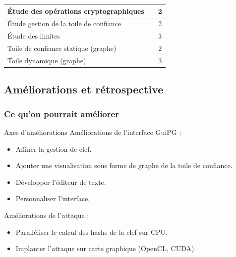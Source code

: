 \begin{frame}
\begin{tabular}{|l|l|l|}
    \hline
    \cellcolor{white}\color{red}\'{E}tude des opérations cryptographiques & \multicolumn{1}{|c|}{\cellcolor{white}\color{black}} & \multicolumn{1}{|c|}{\cellcolor{white}\color{black}2} \\
    \hline
    \cellcolor{white}\color{red}\'{E}tude gestion de la toile de confiance & \multicolumn{1}{|c|}{\cellcolor{white}\color{black}} & \multicolumn{1}{|c|}{\cellcolor{white}\color{black}2} \\
    \hline
    \cellcolor{white}\color{red}\'{E}tude des limites & \multicolumn{1}{|c|}{\cellcolor{white}\color{black}} & \multicolumn{1}{|c|}{\cellcolor{white}\color{black}3} \\
    \hline
    \cellcolor{white}\color{grey}Toile de confiance statique (graphe) & \multicolumn{1}{|c|}{\cellcolor{white}\color{black}} & \multicolumn{1}{|c|}{\cellcolor{white}\color{black}2} \\
    \hline
    \cellcolor{white}\color{grey}Toile dynamique (graphe) & \multicolumn{1}{|c|}{\cellcolor{white}\color{black}} & \multicolumn{1}{|c|}{\cellcolor{white}\color{black}3} \\
    \hline
  \end{tabular}
\end{frame}

\subsection{Améliorations et rétrospective}
  \begin{frame}
    \frametitle{\color{white}Ce qu'on pourrait améliorer}
    \begin{block}{Axes d'améliorations}
      Améliorations de l'interface GuiPG :
      \begin{itemize}
        \item Affiner la gestion de clef.
        \item Ajouter une visualisation sous forme de graphe de la toile de confiance.
        \item Développer l'éditeur de texte.
        \item Personnaliser l'interface.
      \end{itemize}
      Améliorations de l'attaque :
      \begin{itemize}
        \item Paralléliser le calcul des hashs de la clef sur CPU.
        \item Implanter l'attaque sur carte graphique (OpenCL, CUDA).
      \end{itemize}
    \end{block}
    
  \end{frame}


